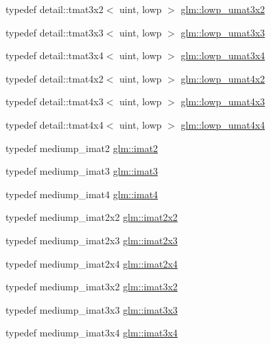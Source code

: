 \begin{DoxyCompactItemize}
\item 
typedef detail\+::tmat3x2$<$ uint, lowp $>$ \hyperlink{group__gtc__matrix__integer_ga5874e964b1816f230215df28d22ea7de}{glm\+::lowp\+\_\+umat3x2}
\item 
typedef detail\+::tmat3x3$<$ uint, lowp $>$ \hyperlink{group__gtc__matrix__integer_ga691694b1a4c6d1e613d8f1f707acc829}{glm\+::lowp\+\_\+umat3x3}
\item 
typedef detail\+::tmat3x4$<$ uint, lowp $>$ \hyperlink{group__gtc__matrix__integer_gad44577fcaebad47da39cc244566d7fe3}{glm\+::lowp\+\_\+umat3x4}
\item 
typedef detail\+::tmat4x2$<$ uint, lowp $>$ \hyperlink{group__gtc__matrix__integer_ga7583563f93096623d54ec8fddd806d13}{glm\+::lowp\+\_\+umat4x2}
\item 
typedef detail\+::tmat4x3$<$ uint, lowp $>$ \hyperlink{group__gtc__matrix__integer_ga03af6e7ea92be81959305fc89a239cf5}{glm\+::lowp\+\_\+umat4x3}
\item 
typedef detail\+::tmat4x4$<$ uint, lowp $>$ \hyperlink{group__gtc__matrix__integer_ga394ee910348beffe9c7d6b694d5efe5f}{glm\+::lowp\+\_\+umat4x4}
\item 
typedef mediump\+\_\+imat2 \hyperlink{group__gtc__matrix__integer_ga77a581b3366fb63fc72f8f20830003e0}{glm\+::imat2}
\item 
typedef mediump\+\_\+imat3 \hyperlink{group__gtc__matrix__integer_ga45481922dd07a3a8e23758286311ee97}{glm\+::imat3}
\item 
typedef mediump\+\_\+imat4 \hyperlink{group__gtc__matrix__integer_ga40fc5c5e0b07543497aa1c314891544a}{glm\+::imat4}
\item 
typedef mediump\+\_\+imat2x2 \hyperlink{group__gtc__matrix__integer_gaf7f44f44d966377666d41ed059524732}{glm\+::imat2x2}
\item 
typedef mediump\+\_\+imat2x3 \hyperlink{group__gtc__matrix__integer_ga143bc5177bac9991d84b70da03952516}{glm\+::imat2x3}
\item 
typedef mediump\+\_\+imat2x4 \hyperlink{group__gtc__matrix__integer_gafe2d058e164fd1badace451ffcf4ae46}{glm\+::imat2x4}
\item 
typedef mediump\+\_\+imat3x2 \hyperlink{group__gtc__matrix__integer_ga04deef94cdfdd3b3b2706e10a32ef7f3}{glm\+::imat3x2}
\item 
typedef mediump\+\_\+imat3x3 \hyperlink{group__gtc__matrix__integer_gaeff9ef8f56cccc828d6b897923e75402}{glm\+::imat3x3}
\item 
typedef mediump\+\_\+imat3x4 \hyperlink{group__gtc__matrix__integer_gaee5507e6cbbdd05841a0c174e60dd036}{glm\+::imat3x4}

\end{DoxyCompactItemize}
